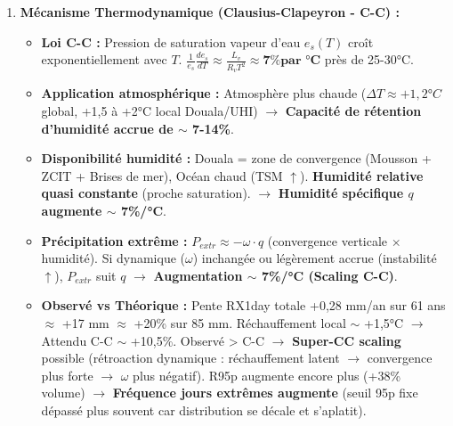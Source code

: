 \documentclass[11pt]{article}
\begin{document}
\begin{exoresolu}
\begin{enumerate}
\begin{itemize}
              \item \textbf{Mann-Kendall ($p < 0,05$) :} Rejet de l'hypothèse nulle $H_0$ "pas de tendance monotone". La tendance à la hausse est \textbf{statistiquement significative} (probabilité < 5\% qu'elle soit due au hasard/variabilité interne). Il y a un \textbf{signal climatique détectable}.
              \item \textbf{Sen vs Moindres Carrés (OLS) :} OLS sensible aux \textbf{valeurs aberrantes (outliers)}. Une seule année exceptionnelle (ex: 2020) fausse la pente OLS. L'estimateur de \textbf{Sen (Theil-Sen)} calcule la médiane de toutes les pentes entre paires de points $\rightarrow$ \textbf{Robuste} (point de rupture 29\%). Donne la \textbf{magnitude réelle} de la tendance centrale, non biaisée par les extrêmes de la série elle-même.
          \end{itemize}
    \item \textbf{Mécanisme Thermodynamique (Clausius-Clapeyron - C-C) :}
          \begin{itemize}
              \item \textbf{Loi C-C :} Pression de saturation vapeur d'eau $e_s(T)$ croît exponentiellement avec $T$. $\frac{1}{e_s}\frac{de_s}{dT} \approx \frac{L_v}{R_v T^2} \approx \textbf{7\% par °C}$ près de 25-30°C.
              \item \textbf{Application atmosphérique :} Atmosphère plus chaude ($\Delta T \approx +1,2°C$ global, +1,5 à +2°C local Douala/UHI) $\rightarrow$ \textbf{Capacité de rétention d'humidité accrue de $\sim$ 7-14\%}.
              \item \textbf{Disponibilité humidité :} Douala = zone de convergence (Mousson + ZCIT + Brises de mer), Océan chaud (TSM $\uparrow$). \textbf{Humidité relative quasi constante} (proche saturation). $\rightarrow$ \textbf{Humidité spécifique $q$ augmente $\sim$ 7\%/°C}.
              \item \textbf{Précipitation extrême :} $P_{extr} \approx -\omega \cdot q$ (convergence verticale $\times$ humidité). Si dynamique ($\omega$) inchangée ou légèrement accrue (instabilité $\uparrow$), $P_{extr}$ suit $q$ $\rightarrow$ \textbf{Augmentation $\sim$ 7\%/°C (Scaling C-C)}.
              \item \textbf{Observé vs Théorique :} Pente RX1day totale +0,28 mm/an sur 61 ans $\approx$ +17 mm $\approx$ +20\% sur 85 mm. Réchauffement local $\sim$ +1,5°C $\rightarrow$ Attendu C-C $\sim$ +10,5\%. Observé > C-C $\rightarrow$ \textbf{Super-CC scaling} possible (rétroaction dynamique : réchauffement latent $\rightarrow$ convergence plus forte $\rightarrow$ $\omega$ plus négatif). R95p augmente encore plus (+38\% volume) $\rightarrow$ \textbf{Fréquence jours extrêmes augmente} (seuil 95p fixe dépassé plus souvent car distribution se décale et s'aplatit).

\end{itemize}
\end{enumerate}
\end{exoresolu}
\end{document}
